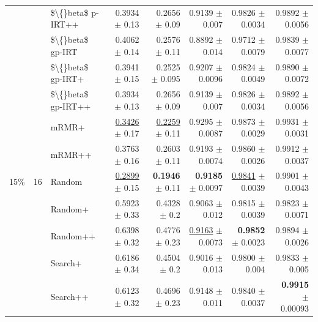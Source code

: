 \begin{longtable}{llp{}rrrrr}
 &  & \$\textbackslash\{\}beta\$ p-IRT++ & 0.3934 {\scriptsize $\pm$ 0.13} & 0.2656 {\scriptsize $\pm$ 0.09} & 0.9139 {\scriptsize $\pm$ 0.007} & 0.9826 {\scriptsize $\pm$ 0.0034} & 0.9892 {\scriptsize $\pm$ 0.0056} \\
 &  & \$\textbackslash\{\}beta\$ gp-IRT & 0.4062 {\scriptsize $\pm$ 0.14} & 0.2576 {\scriptsize $\pm$ 0.11} & 0.8892 {\scriptsize $\pm$ 0.014} & 0.9712 {\scriptsize $\pm$ 0.0079} & 0.9839 {\scriptsize $\pm$ 0.0077} \\
 &  & \$\textbackslash\{\}beta\$ gp-IRT+ & 0.3941 {\scriptsize $\pm$ 0.15} & 0.2525 {\scriptsize $\pm$ 0.095} & 0.9207 {\scriptsize $\pm$ 0.0096} & 0.9824 {\scriptsize $\pm$ 0.0049} & 0.9890 {\scriptsize $\pm$ 0.0072} \\
 &  & \$\textbackslash\{\}beta\$ gp-IRT++ & 0.3934 {\scriptsize $\pm$ 0.13} & 0.2656 {\scriptsize $\pm$ 0.09} & 0.9139 {\scriptsize $\pm$ 0.007} & 0.9826 {\scriptsize $\pm$ 0.0034} & 0.9892 {\scriptsize $\pm$ 0.0056} \\
 &  & mRMR+ & \underline{0.3426} {\scriptsize $\pm$ 0.17} & \underline{0.2259} {\scriptsize $\pm$ 0.11} & 0.9295 {\scriptsize $\pm$ 0.0087} & 0.9873 {\scriptsize $\pm$ 0.0029} & 0.9931 {\scriptsize $\pm$ 0.0031} \\
 &  & mRMR++ & 0.3763 {\scriptsize $\pm$ 0.16} & 0.2603 {\scriptsize $\pm$ 0.11} & 0.9193 {\scriptsize $\pm$ 0.0074} & 0.9860 {\scriptsize $\pm$ 0.0026} & 0.9912 {\scriptsize $\pm$ 0.0037} \\
\midrule
15\% & 16 & Random & \underline{0.2899} {\scriptsize $\pm$ 0.15} & \textbf{0.1946} {\scriptsize $\pm$ 0.11} & \textbf{0.9185} {\scriptsize $\pm$ 0.0097} & \underline{0.9841} {\scriptsize $\pm$ 0.0039} & 0.9901 {\scriptsize $\pm$ 0.0043} \\
 &  & Random+ & 0.5923 {\scriptsize $\pm$ 0.33} & 0.4328 {\scriptsize $\pm$ 0.2} & 0.9063 {\scriptsize $\pm$ 0.012} & 0.9815 {\scriptsize $\pm$ 0.0039} & 0.9823 {\scriptsize $\pm$ 0.0071} \\
 &  & Random++ & 0.6398 {\scriptsize $\pm$ 0.32} & 0.4776 {\scriptsize $\pm$ 0.23} & \underline{0.9163} {\scriptsize $\pm$ 0.0073} & \textbf{0.9852} {\scriptsize $\pm$ 0.0023} & 0.9894 {\scriptsize $\pm$ 0.0026} \\
 &  & Search+ & 0.6186 {\scriptsize $\pm$ 0.34} & 0.4504 {\scriptsize $\pm$ 0.2} & 0.9016 {\scriptsize $\pm$ 0.013} & 0.9800 {\scriptsize $\pm$ 0.004} & 0.9833 {\scriptsize $\pm$ 0.005} \\
 &  & Search++ & 0.6123 {\scriptsize $\pm$ 0.32} & 0.4696 {\scriptsize $\pm$ 0.23} & 0.9148 {\scriptsize $\pm$ 0.011} & 0.9840 {\scriptsize $\pm$ 0.0037} & \textbf{0.9915} {\scriptsize $\pm$ 0.00093} \\

\end{longtable}
